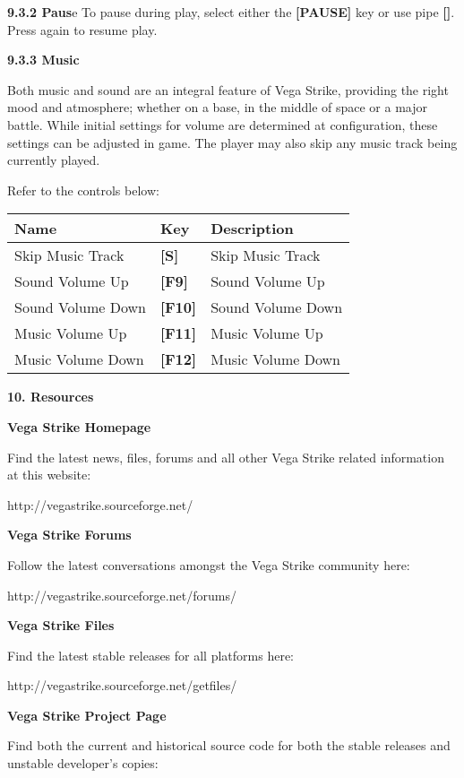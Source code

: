 \documentclass{article}
\begin{document}
\textbf{}

\textbf{9.3.2 Paus}e To pause during play, select either the \textbf{[PAUSE] }key or use pipe \textbf{[\textbar  ]}. Press again to resume play. 

\textbf{9.3.3 Music }

Both music and sound are an integral feature of Vega Strike, providing the right mood and atmosphere; whether on a base, in the middle of space or a major battle. While initial settings for volume are determined at configuration, these settings can be adjusted in game. The player may also skip any music track being currently played. 

Refer to the controls below: 

\begin{tabular}{|p{1.3in}|p{0.4in}|p{1.7in}|} \hline 
\textbf{ Name } & \textbf{Key } & \textbf{Description } \\ \hline 
Skip Music Track  & \textbf{[S] } & Skip Music Track  \\ \hline 
Sound Volume Up  & \textbf{[F9] } & Sound Volume Up  \\ \hline 
Sound Volume Down  & \textbf{[F10] } & Sound Volume Down  \\ \hline 
Music Volume Up  & \textbf{[F11] } & Music Volume Up  \\ \hline 
Music Volume Down  & \textbf{[F12] } & Music Volume Down  \\ \hline 
\end{tabular}



\textbf{10. Resources }

\textbf{Vega Strike Homepage }

Find the latest news, files, forums and all other Vega Strike related information at this website: 

http://vegastrike.sourceforge.net/\textbf{}

\textbf{Vega Strike Forums }

Follow the latest conversations amongst the Vega Strike community here: 

http://vegastrike.sourceforge.net/forums/\textbf{}

\textbf{Vega Strike Files }

Find the latest stable releases for all platforms here: 

http://vegastrike.sourceforge.net/getfiles/\textbf{}

\textbf{Vega Strike Project Page }

Find both the current and historical source code for both the stable releases and unstable developer's copies: 
\end{document}
